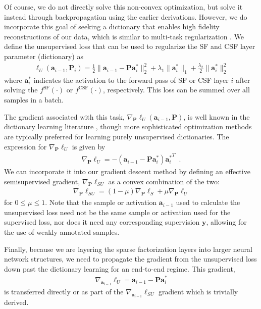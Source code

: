 \documentclass[10pt,twocolumn,letterpaper]{article}
\renewcommand{\vec}{\mathbf}
\newcommand{\grad}[2]{\nabla_{\!\! #1} #2}
\newcommand{\loss}{\ensuremath{\ell}}
\newcommand{\y}{\vec{y}}
\renewcommand{\P}{\vec{P}}
\renewcommand{\a}{\vec{a}}
\newcommand{\fSF}{^{\text{SF}}}
\newcommand{\fCSF}{^{\text{CSF}}}
\begin{document}
Of course, we do not directly solve this non-convex optimization, but solve it instead through backpropagation using the earlier derivations.  However, we do incorporate this goal of seeking a dictionary that enables high fidelity reconstructions of our data, which is similar to multi-task regularization \cite{LaMaSharXiv2016,EvPoICKDDM2004}.  We define the unsupervised loss that can be used to regularize the SF and CSF layer parameter (dictionary) as
%
\begin{align}
    \loss_U(\a_{i-1},\P_i) = \frac{1}{2}  \lVert \a_{i-1}-\P{\a_i^*}\rVert_2^2 + 
    \lambda_1\lVert{\a_i^*}\rVert_1+\frac{\lambda_2}{2}\lVert{\a_i^*}\rVert_2^2 
\end{align}
%
\noindent where $\a^*_i$ indicates the activation to the forward pass of SF or CSF layer $i$ after solving the $f\fSF(\cdot)$ or $f\fCSF(\cdot)$, respectively.  This loss can be summed over all samples in a batch.

The gradient associated with this task, $\nabla_\P\loss_U(\a_{i-1},\P)$, is well known in the dictionary learning literature \cite{ElBOOK2010}, though more sophisticated optimization methods are typically preferred for learning purely unsupervised dictionaries. The expression for $\nabla_\P\loss_U$ is given by
%
\begin{align}
    \grad{\P}{\loss_U} = -(\a_{i-1}-\P\a_i^*){\a_i^*}^T
\enspace.
\label{eq:grad_U}
\end{align}
%
We can incorporate it into our gradient descent method by defining an effective semisupervised gradient, $\nabla_\P\loss_{SU}$ as a convex combination of the two:
%
\begin{align}
    \grad{\P}{\loss_{SU}} = (1-\mu)\nabla_\P\loss_S + \mu\nabla_\P\loss_U
\label{eq:loss_SU}
\end{align}
%
for $0\le\mu\le1$. Note that the sample or activation $\a_{i-1}$ used to calculate the unsupervised loss need not be the same sample or activation used for the supervised loss, nor does it need any corresponding supervision $\y$, allowing for the use of weakly annotated samples.

Finally, because we are layering the sparse factorization layers into larger neural network structures, we need to propagate the gradient from the unsupervised loss down past the dictionary learning for an end-to-end regime.  This gradient,
%
\begin{align}
    \grad{\a_{i-1}}{\loss_{U}} = \a_{i-1}-\P\a_i^* 
\end{align}
%
is transferred directly or as part of the $\nabla_{\a_{i-1}}\loss_{SU}$ gradient which is trivially derived.
\end{document}
